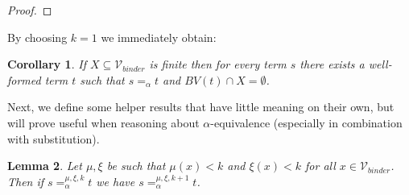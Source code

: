 \documentclass{lmcs}
\theoremstyle{theorem}\newtheorem{theorem}{Theorem}
\theoremstyle{theorem}\newtheorem{lemma}[theorem]{Lemma}
\theoremstyle{theorem}\newtheorem{corollary}[theorem]{Corollary}
\theoremstyle{definition}\newtheorem{definition}[theorem]{Definition}
\theoremstyle{definition}\newtheorem{example}[theorem]{Example}
\newcommand{\Vbound}{\mathcal{V}_{\mathit{binder}}}
\newcommand{\FV}{\mathit{FV}}
\newcommand{\BV}{\mathit{BV}}
\newcommand{\avar}{x}
\newcommand{\bvar}{y}
\newcommand{\cvar}{z}
\newcommand{\abs}[2]{\lambda #1.#2}
\begin{document}
\begin{proof}
\end{proof}

By choosing $k = 1$ we immediately obtain:

\begin{corollary}\label{cor:wellformedcounterpart}
If $X \subseteq \Vbound$ is finite then for every term $s$ there exists a
well-formed term $t$ such that $s =_\alpha t$ and $\BV(t) \cap X = \emptyset$.
\end{corollary}

Next, we define some helper results that have little meaning on their own, but
will prove useful when reasoning about $\alpha$-equivalence (especially in
combination with substitution).

\begin{lemma}\label{lem:alphaincrease}
Let $\mu,\xi$ be such that $\mu(\avar) < k$ and $\xi(\avar) < k$ for all
$\avar \in \Vbound$. \\
Then if $s =_\alpha^{\mu,\xi,k} t$ we have $s =_\alpha^{\mu,\xi,k+1} t$.
\end{lemma}
\end{document}
